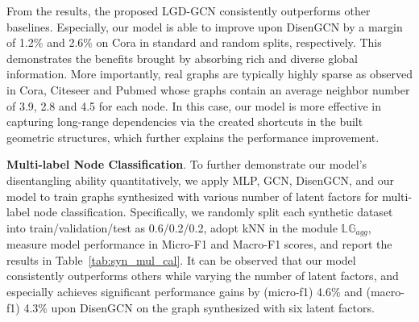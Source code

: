 \documentclass[accepted]{uai2021} %
\begin{document}
From the results, the proposed LGD-GCN consistently outperforms other baselines. Especially, our model is able to improve upon DisenGCN by a margin of 1.2\% and 2.6\% on Cora in standard and random splits, respectively. This demonstrates the benefits brought by absorbing rich and diverse global information. More importantly, real graphs are typically highly sparse as observed in Cora, Citeseer and Pubmed whose graphs contain an average neighbor number of 3.9, 2.8 and 4.5 for each node. In this case, our model is more effective in capturing long-range dependencies via the created shortcuts in the built geometric structures, which further explains the performance improvement.

\textbf{Multi-label Node Classification}. To further demonstrate our model's disentangling ability quantitatively, we apply MLP, GCN, DisenGCN, and our model to train graphs synthesized with various number of latent factors for multi-label node classification. Specifically, we randomly split each synthetic dataset into train/validation/test as 0.6/0.2/0.2, adopt kNN in the module $\mathbb{LG}_{agg}$, measure model performance in Micro-F1 and Macro-F1 scores, and report the results in Table~\ref{tab:syn_mul_cal}. It can be observed that our model consistently outperforms others while varying the number of latent factors, and especially achieves significant performance gains by (micro-f1) 4.6\% and (macro-f1) 4.3\% upon DisenGCN on the graph synthesized with six latent factors.
\end{document}
